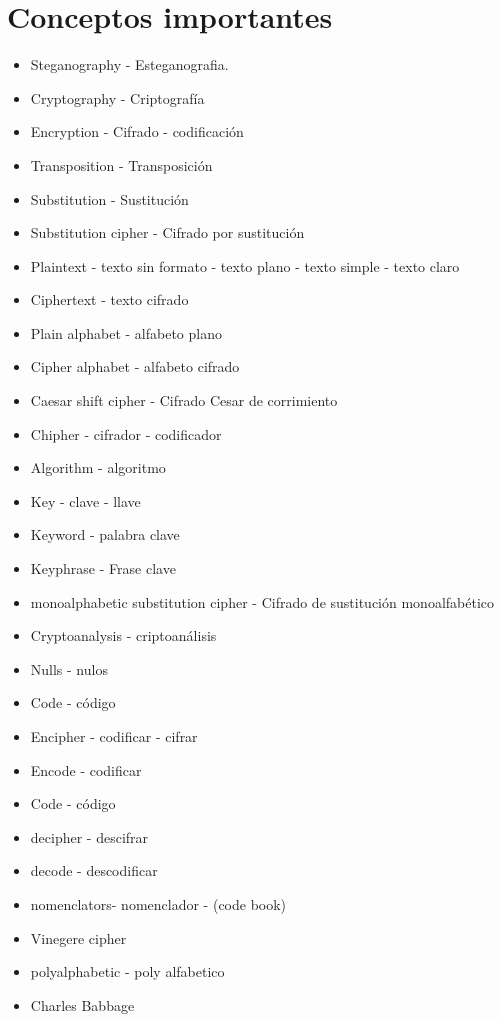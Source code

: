 	 \section{Conceptos importantes}
	 	\begin{itemize}
	 		\item Steganography - Esteganografia.
	 		\item Cryptography - Criptografía
	 		\item Encryption - Cifrado - codificación
	 		\item Transposition - Transposición
	 		\item Substitution - Sustitución
	 		\item Substitution cipher - Cifrado por sustitución
	 		\item Plaintext - texto sin formato - texto plano - texto simple - texto claro
	 		\item Ciphertext - texto cifrado
	 		\item Plain alphabet - alfabeto plano
	 		\item Cipher alphabet - alfabeto cifrado
	 		\item Caesar shift cipher - Cifrado Cesar de corrimiento
	 		\item Chipher - cifrador - codificador
	 		\item Algorithm - algoritmo
	 		\item Key - clave - llave
	 		\item Keyword - palabra clave
	 		\item Keyphrase - Frase clave
	 		\item monoalphabetic substitution cipher - Cifrado de sustitución monoalfabético
	 		\item Cryptoanalysis - criptoanálisis
	 		\item Nulls - nulos
	 		\item Code - código
	 		\item Encipher - codificar - cifrar
	 		\item Encode - codificar
	 		\item Code - código
	 		\item decipher - descifrar
	 		\item decode - descodificar
	 		\item nomenclators- nomenclador - (code book)
	 		\item Vinegere cipher
	 		\item polyalphabetic - poly alfabetico
	 		\item Charles Babbage
	 		
	 	\end{itemize}
